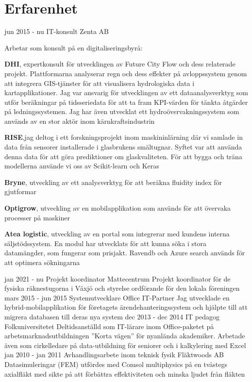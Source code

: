 \documentclass[]{friggeri-cv}
\begin{document}
\section{Erfarenhet}
\begin{entrylist}
  \entry
    {jun 2015 - nu}
    {IT-konsult}
    {Zenta AB}
    {
Arbetar som konsult på en digitaliseringsbyrå: \newline 

 \textbf{DHI}, expertkonsult för utvecklingen av Future City Flow och dess relaterade projekt. Plattformarna analyserar regn och dess effekter på avloppssystem genom att integrera GIS-tjänster för att visualisera hydrologiska data i kartapplikationer. Jag var ansvarig för utvecklingen av ett dataanalysverktyg som utför beräkningar på tidsseriedata för att ta fram KPI-värden för tänkta åtgärder på ledningssystemen.
Jag har även utvecklat ett hydroövervakningssystem som används av en stor aktör inom kärnkraftsindustrin\newline

 \textbf{RISE},jag deltog i ett forskningsprojekt inom maskininlärning där vi samlade in data från sensorer installerade i glasbrukens smältugnar. Syftet var att använda denna data för att göra prediktioner om glaskvaliteten. För att bygga och träna modellerna använde vi oss av Scikit-learn och Keras\newline

  \textbf{Bryne}, utveckling av ett analysverktyg för att beräkna fluidity index för gjutformar\newline
  
  \textbf{Optigrow}, utveckling av en mobilapplikation som används för att övervaka processer på maskiner\newline

  \textbf{Atea logistic}, utveckling av en portal som integrerar med kundens interna säljstödssystem. En modul har utvecklats för att kunna söka i stora datamängder, som fungerar som prisjakt. Ravendb och Azure search används för att optimera sökningarna
 }
 \entry
    {jan 2021 - nu}
    {Projekt koordinator}
    {Mattecentrum}
    {Projekt koordinator för de fysiska räknestugorna i Växjö och styrelse ordförande för den lokala föreningen}
  \entry
    {mars 2015 - jun 2015}
    {Systemutvecklare}
    {Office IT-Partner}
    {Jag utvecklade en hybrid-mobilapplikation för företagets ärendehanteringssystem och hjälpte till att migrera databasen till deras nya system}
    \entry
    {dec 2013 - dec 2014}
    {IT pedagog}
    {Folkuniversitetet}
    {Deltidsanställd som IT-lärare inom Office-paketet på arbetsmarknadsutbildningen ”Korta vägen” för nyanlända akademiker. Arbetade även som cirkelledare på data-utbildning för seniorer och i kalkylering med Excel }
    \entry
    {jan 2010 - jan 2011}
    {Avhandlingsarbete inom teknisk fysik}
    {Fläktwoods AB}
    {Datasimuleringar (FEM) utfördes med Comsol multiphysics på en tvåstegs axialfläkt med sikte på att förbättra effektiviteten och minska ljudet från fläkten}
\end{entrylist}
\pagebreak 
\end{document}
